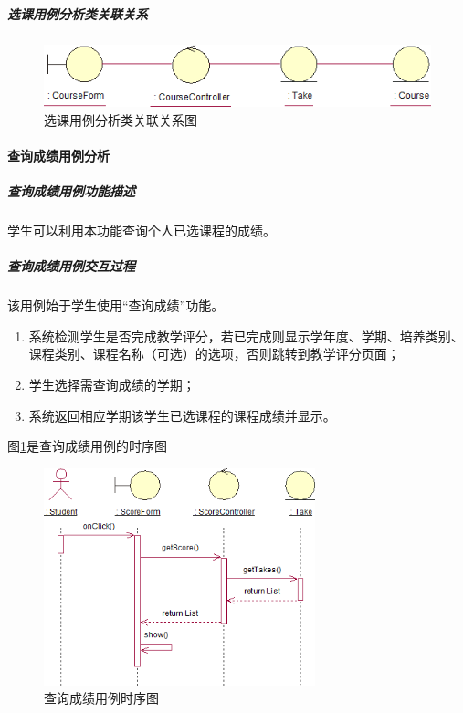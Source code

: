 \subparagraph{选课用例分析类关联关系}
\begin{figure}[H]
  \centering
  \includegraphics[width=\textwidth]{img/selectcourse_depend}
  \caption{选课用例分析类关联关系图}
\end{figure}
  
\paragraph{查询成绩用例分析}
\subparagraph{查询成绩用例功能描述}

学生可以利用本功能查询个人已选课程的成绩。
    
\subparagraph{查询成绩用例交互过程}
    
该用例始于学生使用“查询成绩”功能。
\begin{enumerate}
  \item 系统检测学生是否完成教学评分，若已完成则显示学年度、学期、培养类别、课程类别、课程名称（可选）的选项，否则跳转到教学评分页面；
  \item 学生选择需查询成绩的学期；
  \item 系统返回相应学期该学生已选课程的课程成绩并显示。
\end{enumerate}
    
图\ref{fig:query_achievement_sequence}是查询成绩用例的时序图
\begin{figure}
  \centering
  \includegraphics[width=0.7\textwidth]{img/query_achievement_sequence}
  \caption{查询成绩用例时序图}
  \label{fig:query_achievement_sequence}
\end{figure}
    
